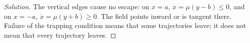 \documentclass[12pt]{amsart}
\theoremstyle{plain}
\theoremstyle{definition}
\theoremstyle{definition}
\theoremstyle{plain}
\newenvironment{solution}
{\begin{proof}[Solution]}
{\end{proof}}
\begin{document}
\begin{solution}
        The vertical edges cause no escape: on $x=a$,
        $\dot x=\mu(y-b)\le0$, and on $x=-a$,
        $\dot x=\mu(y+b)\ge0$. The field points inward or is tangent
        there. Failure of the trapping condition means that some
        trajectories leave; it does not mean that every trajectory leaves.
        \end{solution}
\end{document}
